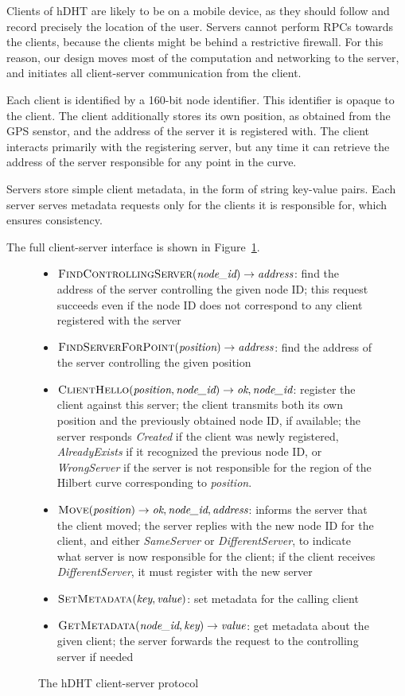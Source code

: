 Clients of hDHT are likely to be on a mobile device, as they should follow and record precisely the location of the user.
Servers cannot perform RPCs towards the clients, because the clients might be behind a restrictive firewall.
For this reason, our design moves most of the computation and networking to the server, and initiates all client-server communication from the client.

Each client is identified by a 160-bit node identifier.
This identifier is opaque to the client.
The client additionally stores its own position, as obtained from the GPS senstor, and the address of the server it is registered with.
The client interacts primarily with the registering server, but any time it can retrieve the address of the server responsible for any point in the curve.

Servers store simple client metadata, in the form of string key-value pairs.
Each server serves metadata requests only for the clients it is responsible for, which ensures consistency.

The full client-server interface is shown in Figure~\ref{fig:client-server}.

\begin{figure}
\small
\begin{itemize}
\item $\textsc{FindControllingServer}(\textit{node\_id}) \rightarrow \textit{address}$: find the address of the server controlling the given node ID; this request succeeds even if the node ID does not correspond to any client registered with the server
\item $\textsc{FindServerForPoint}(\textit{position}) \rightarrow \textit{address}$: find the address of the server controlling the given position
\item $\textsc{ClientHello}(\textit{position}, \textit{node\_id}) \rightarrow \textit{ok}, \textit{node\_id}$: register the client against this server; the client transmits both its own position and the previously obtained node ID, if available; the server responds \textit{Created} if the client was newly registered, \textit{AlreadyExists} if it recognized the previous node ID, or \textit{WrongServer} if the server is not responsible for the region of the Hilbert curve corresponding to \textit{position}.
\item $\textsc{Move}(\textit{position}) \rightarrow \textit{ok}, \textit{node\_id}, \textit{address}$: informs the server that the client moved; the server replies with the new node ID for the client, and either \textit{SameServer} or \textit{DifferentServer}, to indicate what server is now responsible for the client; if the client receives \textit{DifferentServer}, it must register with the new server
\item $\textsc{SetMetadata}(\textit{key}, \textit{value})$: set metadata for the calling client
\item $\textsc{GetMetadata}(\textit{node\_id}, \textit{key}) \rightarrow \textit{value}$: get metadata about the given client; the server forwards the request to the controlling server if needed
\end{itemize}
\caption{The hDHT client-server protocol}
\label{fig:client-server}
\end{figure}

